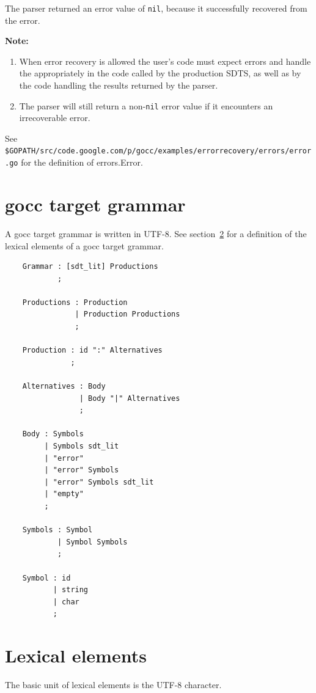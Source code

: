 \documentclass[12pt]{article}
\begin{document}
	The parser returned an error value of \verb|nil|, because it successfully recovered from the error.

	{\bf Note:} \\
	\begin{enumerate}
		\item When error recovery is allowed the user's code must expect errors and handle the appropriately in the code called by the production SDTS, as well as by the code handling the results returned by the parser.

		\item The parser will still return a non-\verb|nil| error value if it encounters an irrecoverable error.
	\end{enumerate}

	See \verb|$GOPATH/src/code.google.com/p/gocc/examples/errorrecovery/errors/error.go| for the definition of errors.Error.

\appendix
\section{gocc target grammar}
	A gocc target grammar is written in UTF-8. See section~\ref{sec:lexical elements} for a definition of the lexical elements of a gocc target grammar. 

	\begin{verbatim}
	Grammar : [sdt_lit] Productions 
	        ;

	Productions : Production					
	            | Production Productions			
	            ;

	Production : id ":" Alternatives		
	           ;

	Alternatives : Body					
	             | Body "|" Alternatives	
	             ; 

	Body : Symbols					
	     | Symbols sdt_lit			
	     | "error"
	     | "error" Symbols
	     | "error" Symbols sdt_lit
	     | "empty"
	     ;

	Symbols	: Symbol					
	        | Symbol Symbols			
	        ;

	Symbol : id							
	       | string						
	       | char	
	       ;
	\end{verbatim}

\section{Lexical elements} \label{sec:lexical elements}
	The basic unit of lexical elements is the UTF-8 character.
\end{document}
